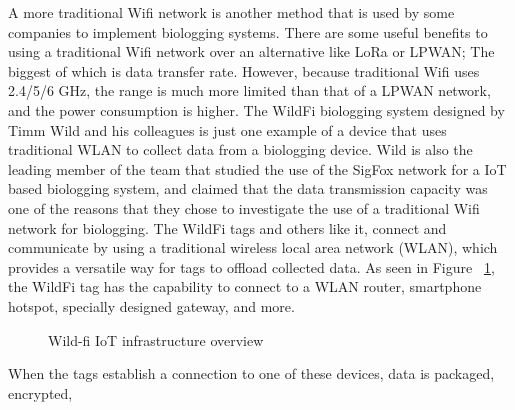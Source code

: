 \documentclass[sigplan,screen,nonacm]{acmart}
\begin{document}
A more traditional Wifi network is another method that is used by some companies to 
implement biologging systems. There are some useful benefits to using a traditional 
Wifi network over an alternative like LoRa or LPWAN; The biggest of which is data 
transfer rate. However, because traditional Wifi uses 2.4/5/6 GHz, the range is much more limited 
than that of a LPWAN network, and the power consumption is higher. The WildFi biologging system designed by 
Timm Wild and his colleagues is just one example of a device that uses traditional 
WLAN to collect data from a biologging device. Wild is also the leading member of the 
team that studied the use of the SigFox network for a IoT based biologging system, and 
claimed that the data transmission capacity was one of the reasons that they chose to 
investigate the use of a traditional Wifi network for biologging\cite{wild2023internet}. 
The WildFi tags and others like it, connect and communicate by using a traditional wireless 
local area network (WLAN), which provides a versatile way for tags to offload collected data. 
As seen in Figure ~\ref{fig:wild-fi_IoT_diagram}, the WildFi tag has the capability to 
connect to a WLAN router, smartphone hotspot, specially designed gateway, and more.
\begin{figure}[htbp]
  \centering
  \caption{Wild-fi IoT infrastructure overview \cite{wild2023internet}}
  \label{fig:wild-fi_IoT_diagram}
\end{figure}
When the tags establish a connection to one of these devices, data is packaged, encrypted, 
\end{document}
